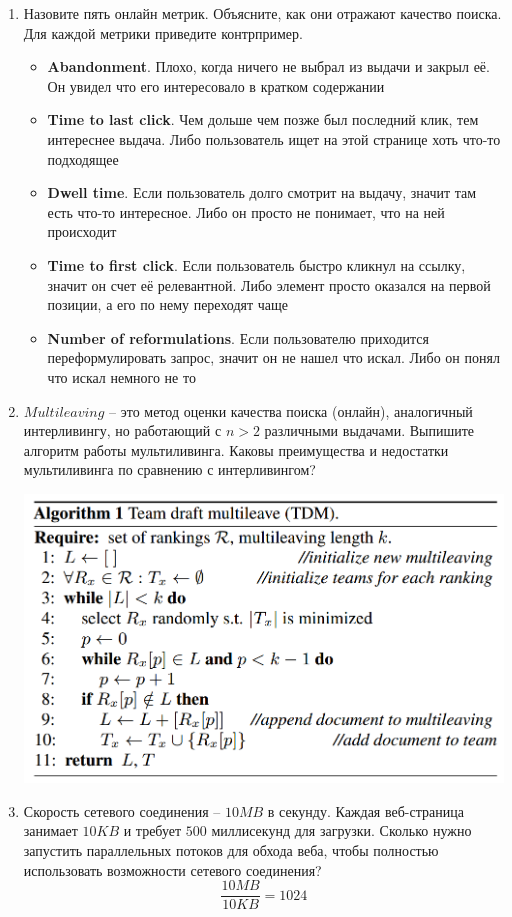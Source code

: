 \begin{enumerate}
	\item Назовите пять онлайн метрик. Объясните, как они отражают качество поиска. Для 
	каждой метрики приведите контрпример.
	\begin{itemize}
		\item \textbf{Abandonment}. Плохо, когда ничего не выбрал из выдачи и закрыл её. Он 
		увидел что его интересовало в кратком содержании
		\item \textbf{Time to last click}. Чем дольше чем позже был последний клик, тем 
		интереснее выдача. Либо пользователь ищет на этой странице хоть что-то подходящее 
		\item \textbf{Dwell time}. Если пользователь долго смотрит на выдачу, значит там 
		есть что-то интересное. Либо он просто не понимает, что на ней происходит
		\item \textbf{Time to first click}. Если пользователь быстро кликнул на ссылку, 
		значит он счет её релевантной. Либо элемент просто оказался на первой позиции, а его 
		по нему переходят чаще
		\item \textbf{Number of reformulations}. Если пользователю приходится 
		переформулировать запрос, значит он не нашел что искал. Либо он понял что искал 
		немного не то
	\end{itemize}
	
	\item $Multileaving$ – это метод оценки качества поиска (онлайн), аналогичный 
	интерливингу, но работающий с $n > 2$ различными выдачами. Выпишите алгоритм работы 
	мультиливинга. Каковы преимущества и недостатки мультиливинга по сравнению с 
	интерливингом?
	
	\includegraphics[scale=0.38]{ha/img/multileaving.PNG}
	
	\item Скорость сетевого соединения – $10MB$ в секунду. Каждая веб-страница занимает 
	$10KB$ и требует $500$ миллисекунд для загрузки. Сколько нужно запустить параллельных 
	потоков для обхода веба, чтобы полностью использовать возможности сетевого соединения?
	\begin{equation*}
		\frac{10MB}{10KB} = 1024
	\end{equation*}


\end{enumerate}

